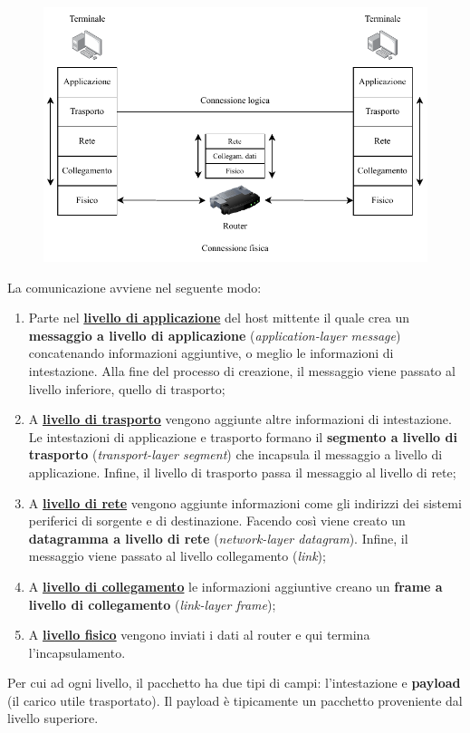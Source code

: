 \documentclass[a4paper]{article}
\begin{document}
	\begin{figure}[!htp]
		\centering
		\includegraphics[width=\textwidth]{img/incapsulamento.pdf}
	\end{figure}

	La comunicazione avviene nel seguente modo:
	
	\begin{enumerate}
		\item Parte nel \textbf{\underline{livello di applicazione}} del host mittente il quale crea un \textbf{messaggio a livello di applicazione} (\emph{application-layer message}) concatenando informazioni aggiuntive, o meglio le informazioni di intestazione. Alla fine del processo di creazione, il messaggio viene passato al livello inferiore, quello di trasporto;
		
		\item A \textbf{\underline{livello di trasporto}} vengono aggiunte altre informazioni di intestazione. Le intestazioni di applicazione e trasporto formano il \textbf{segmento a livello di trasporto} (\emph{transport-layer segment}) che incapsula il messaggio a livello di applicazione. Infine, il livello di trasporto passa il messaggio al livello di rete;
		
		\item A \textbf{\underline{livello di rete}} vengono aggiunte informazioni come gli indirizzi dei sistemi periferici di sorgente e di destinazione. Facendo così viene creato un \textbf{datagramma a livello di rete} (\emph{network-layer datagram}). Infine, il messaggio viene passato al livello collegamento (\emph{link});
		
		\item A \textbf{\underline{livello di collegamento}} le informazioni aggiuntive creano un \textbf{frame a livello di collegamento} (\emph{link-layer frame});
		
		\item A \textbf{\underline{livello fisico}} vengono inviati i dati al router e qui termina l'incapsulamento.
	\end{enumerate}

	\noindent
	Per cui ad ogni livello, il pacchetto ha due tipi di campi: l’intestazione e \textbf{payload} (il carico utile trasportato). Il payload è tipicamente un pacchetto proveniente dal livello superiore.
\end{document}
